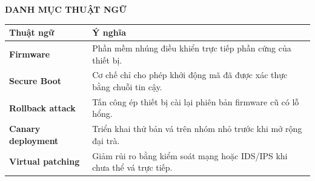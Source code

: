 \documentclass[../DoAn.tex]{subfiles}
\begin{document}
\begin{center}
    \textbf{DANH MỤC THUẬT NGỮ } \\
\end{center}
\vspace{0.5cm}
\begin{longtable}{l p{10cm}}
\hline
\textbf{Thuật ngữ} & \textbf{Ý nghĩa} \\ \hline
\textbf{Firmware} & Phần mềm nhúng điều khiển trực tiếp phần cứng của thiết bị. \\
\textbf{Secure Boot} & Cơ chế chỉ cho phép khởi động mã đã được xác thực bằng chuỗi tin cậy. \\
\textbf{Rollback attack} & Tấn công ép thiết bị cài lại phiên bản firmware cũ có lỗ hổng. \\
\textbf{Canary deployment} & Triển khai thử bản vá trên nhóm nhỏ trước khi mở rộng đại trà. \\
\textbf{Virtual patching} & Giảm rủi ro bằng kiểm soát mạng hoặc IDS/IPS khi chưa thể vá trực tiếp. \\
\hline
\end{longtable}
\end{document}

